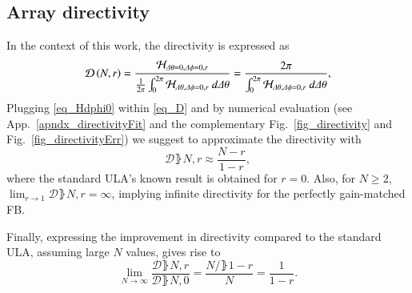 \subsection{Array directivity}
In the context of this work, the directivity is expressed as
\begin{equation}\label{eq_D}
    \mathcal{D}\rBrace{N,r} = \frac{\Hr_{\Delta\theta=0,\Delta\phi=0,r}}{\frac{1}{2\pi}\int_{0}^{2\pi}\Hr_{\Delta\theta,\Delta\phi=0,r}\ d\Delta\theta} = \frac{2\pi}{\int_{0}^{2\pi}\Hr_{\Delta\theta,\Delta\phi=0,r}\ d\Delta\theta},
\end{equation}
Plugging \eqref{eq_Hdphi0} within \eqref{eq_D} and by numerical evaluation (see App.~\ref{apndx_directivityFit} and the complementary Fig.~\ref{fig_directivity} and Fig.~\ref{fig_directivityErr}) we suggest to approximate the directivity with 
\begin{equation}\label{eq_D_result}
    \mathcal{D}\rBrace{N,r} \approx \frac{N-r}{1-r},
\end{equation}
where the standard ULA's known result is obtained for $r=0$.
Also, for $N\geq2$, $\lim_{r\rightarrow 1}\mathcal{D}\rBrace{N,r}=\infty$, implying infinite directivity for the perfectly gain-matched FB. 
\par Finally, expressing the improvement in directivity compared to the standard ULA, assuming large $N$ values, gives rise to
\begin{equation}\label{eq_Dimprovement}
\lim_{N\to\infty}\frac{\mathcal{D}\rBrace{N,r}}{\mathcal{D}\rBrace{N,0}}
=\frac{N/\rBrace{1-r}}{N}=\frac{1}{1-r}.
\end{equation}
